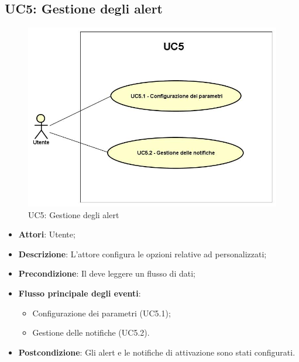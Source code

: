 \subsection{UC5: Gestione degli alert}
\begin{figure} [H]
 	\centering
 	\includegraphics[scale=0.45]{Img/UC5}
 	\caption{UC5: Gestione degli alert}\label{}
\end{figure}
\begin{itemize}
	\item \textbf{Attori}: Utente;
	\item \textbf{Descrizione}: L'attore configura le opzioni relative ad  personalizzati;
	\item \textbf{Precondizione}: Il  deve leggere un flusso di dati;
	\item \textbf{Flusso principale degli eventi}:
		\begin{itemize}
			\item Configurazione dei parametri (UC5.1);
			\item Gestione delle notifiche (UC5.2).
		\end{itemize}
	\item \textbf{Postcondizione}: Gli alert e le notifiche di attivazione sono stati configurati.
\end{itemize}

